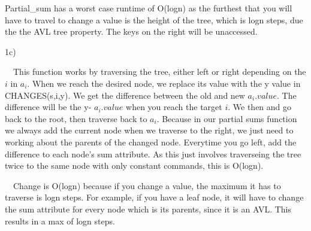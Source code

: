 \documentclass{assignment-263}
\begin{document}
\begin{enumerate}
\begin{verbatim}
\end{verbatim}
Partial\_sum has a worst case runtime of O(logn) as the furthest that you will have to travel to change a value is the height of the tree, which is logn steps, due the the AVL tree property. The keys on the right will be unaccessed.\\

\vskip 15pt

1c)

\ \ This function works by traversing the tree, either left or right depending on the $i$ in $a_i$. When we reach the desired node, we replace its value with the y value in CHANGES(s,i,y). We get the difference between the old and new $a_i.value$.  The difference will be the y- $a_i.value$  when you reach the target $i$. We then and go back to the root, then traverse back to $a_i$. Because in our partial sums function we always add the current node when we traverse to the right, we just need to working about the parents of the changed node. Everytime you go left, add the difference to each node's sum attribute. As this just involves traverseing the tree twice to the same node with only constant commands, this is O(logn).

\ \ Change is O(logn) because if you change a value, the maximum it has to traverse is logn steps. For example, if you have a leaf node, it will have to change the sum attribute for every node which is its parents, since it is an AVL. This results in a max of logn steps.

\end{enumerate}

\program
\end{document}
